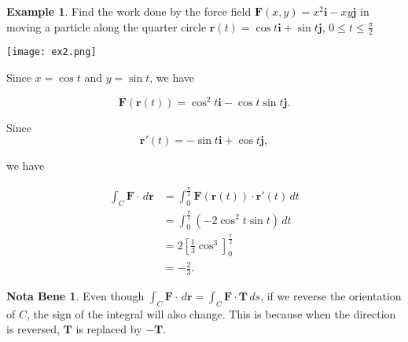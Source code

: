 \documentclass[11pt,oneside,english]{amsart}
\theoremstyle{definition}
\newtheorem*{example}{Example}
\newtheorem*{note}{Nota Bene}
\begin{document}
\begin{example}
Find the work done by the force field $\mathbf{F}(x,y)=x^2\mathbf{i}-xy\mathbf{j}$ in moving a particle along the quarter circle $\mathbf{r}(t)=\cos t\mathbf{i}+\sin t\mathbf{j}$, $0\leq t \leq \frac{\pi}{2}$

\begin{center}
\texttt{[image: ex2.png]}

\end{center}
Since $x=\cos t$ and $y=\sin t$, we have 

\[
\mathbf{F}(\mathbf{r}(t))=\cos^2 t\mathbf{i}-\cos t\sin t \mathbf{j}.
\]

Since
\[
\mathbf{r}'(t)=-\sin t\mathbf{i}+\cos t\mathbf{j},
\]

we have

\begin{align*}
\int_C\mathbf{F}\cdot\,d\mathbf{r}&= \int_0^{\frac{\pi}{2}}\mathbf{F}(\mathbf{r}(t))\cdot\mathbf{r}'(t)\,dt\\[2mm]
&=\int_0^{\frac{\pi}{2}}(-2\cos^2t\sin t)\,dt\\[2mm]
&=2\left[\frac{1}{3}\cos^3\right]_0^{\frac{\pi}{2}}\\[2mm]
&=-\frac{2}{3}.
\end{align*}

\end{example}

\begin{note}
Even though $\displaystyle \int_C\mathbf{F}\cdot\,d\mathbf{r}=\int_C\mathbf{F}\cdot\mathbf{T}\,ds$, if we reverse the orientation of $C$, the sign of the integral will also change. This is because when the direction is reversed, $\mathbf{T}$ is replaced by $-\mathbf{T}$.
\end{note}
\end{document}
